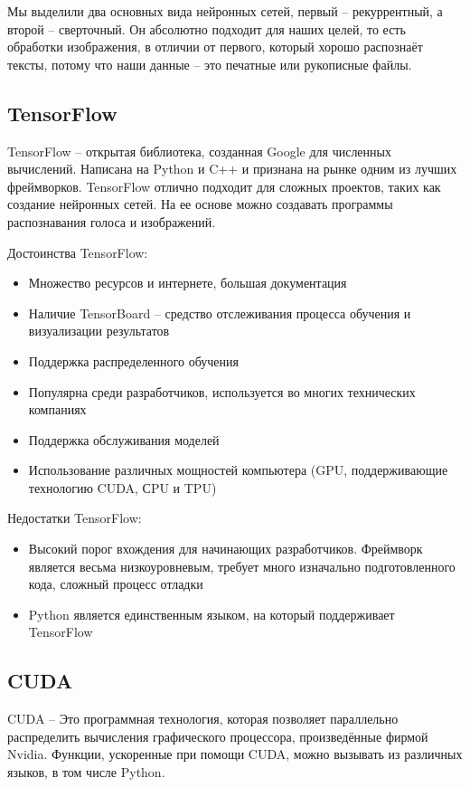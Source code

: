 \documentclass[a4paper, 12pt]{report}
\begin{document}
Мы выделили два основных вида  нейронных сетей, первый – рекуррентный, а второй – сверточный. Он абсолютно подходит для наших целей, то есть обработки изображения, в отличии от первого, который хорошо распознаёт тексты, потому что наши данные – это печатные или рукописные файлы.


\subsection{TensorFlow}
TensorFlow – открытая библиотека, созданная Google для численных вычислений. Написана на Python и C++ и признана на рынке одним из лучших фреймворков. TensorFlow отлично подходит для сложных проектов, таких как создание нейронных сетей. На ее основе можно создавать программы распознавания голоса и изображений.

Достоинства TensorFlow:
\begin{itemize}
  \item Множество ресурсов и интернете, большая документация
  \item Наличие TensorBoard – средство отслеживания процесса обучения и визуализации результатов
  \item Поддержка распределенного обучения
  \item Популярна среди разработчиков, используется во многих технических компаниях
  \item Поддержка обслуживания моделей
  \item Использование различных мощностей компьютера (GPU, поддерживающие технологию CUDA, СPU и TPU)
\end{itemize}

Недостатки TensorFlow:
\begin{itemize}
  \item Высокий порог вхождения для начинающих разработчиков. Фреймворк является весьма низкоуровневым, требует много изначально подготовленного кода, сложный процесс отладки
  \item Python является единственным языком, на который поддерживает TensorFlow
\end{itemize}

\subsection{CUDA}
CUDA – Это программная технология, которая позволяет параллельно распределить вычисления графического процессора, произведённые фирмой Nvidia. Функции, ускоренные при помощи CUDA, можно вызывать из различных языков, в том числе Python.
\end{document}
